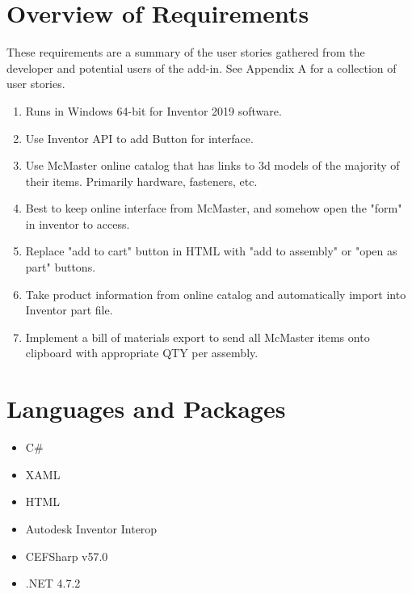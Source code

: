 \documentclass[12pt, letterpaper]{article}
\begin{document}
\section{Overview of Requirements}
These requirements are a summary of the user stories gathered from the developer and potential users of the add-in. See Appendix A
for a collection of user stories.
\begin{enumerate}
\item Runs in Windows 64-bit for Inventor 2019 software.
\item Use Inventor API to add Button for interface.
\item Use McMaster online catalog that has links to 3d models of the majority of their items. Primarily hardware, fasteners, etc.
\item Best to keep online interface from McMaster, and somehow open the "form" in inventor to access.
\item Replace "add to cart" button in HTML with "add to assembly" or "open as part" buttons.
\item Take product information from online catalog and automatically import into Inventor part file.
\item Implement a bill of materials export to send all McMaster items onto clipboard with appropriate QTY per assembly.
\end{enumerate}
\newpage
\section{Languages and Packages}
\begin{multicols}{2}

\begin{itemize}
    \item C\#
    \item XAML
    \item HTML
    \item Autodesk Inventor Interop
    \item CEFSharp v57.0 \cite{CEFSharp}
    \item .NET 4.7.2 \cite{NET}
\end{itemize}
\end{multicols}
\end{document}
